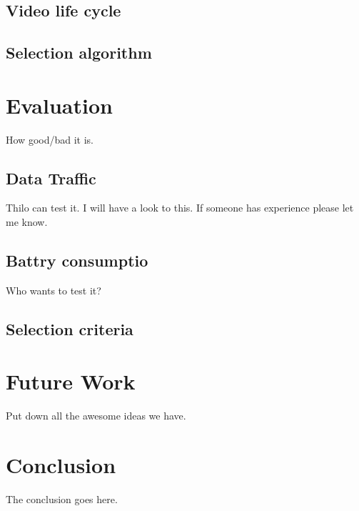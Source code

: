 \documentclass[conference]{IEEEtran}
\begin{document}
\subsection{Video life cycle}

\subsection{Selection algorithm}

\section{Evaluation}
How good/bad it is.

\subsection{Data Traffic} 
Thilo can test it. I will have a look to this. If someone has experience please let me know.

\subsection{Battry consumptio}
Who wants to test it?

\subsection{Selection criteria}

\section{Future Work}
Put down all the awesome ideas we have.

\section{Conclusion}
The conclusion goes here.



\end{document}

